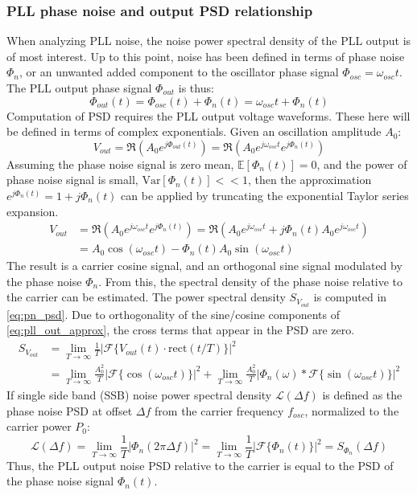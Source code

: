 	\subsubsection{PLL phase noise and output PSD relationship}\label{pn_noise_psd}
		When analyzing PLL noise, the noise power spectral density of the PLL output is of most interest. Up to this point, noise has been defined in terms of phase noise $\Phi_{n}$, or an unwanted added component to the oscillator phase signal $\Phi_{osc}=\omega_{osc}t$. The PLL output phase signal $\Phi_{out}$ is thus:
		\begin{equation}
			\Phi_{out}(t) = \Phi_{osc}(t) + \Phi_{n}(t) = \omega_{osc}t + \Phi_{n}(t) 
		\end{equation}
		Computation of PSD requires the PLL output voltage waveforms. These here will be defined in terms of complex exponentials. Given an oscillation amplitude $A_0$:
		\begin{equation}
			V_{out} = \Re\left(A_0e^{j\Phi_{out}(t)}\right) = \Re\left(A_0e^{j\omega_{osc}t}e^{j\Phi_{n}(t)}\right)
		\end{equation}
		Assuming the phase noise signal is zero mean, $\mathbb{E}[\Phi_{n}(t)]=0$, and the power of phase noise signal is small, $\mathrm{Var}[\Phi_{n}(t)] << 1$, then the approximation $e^{j\Phi_{n}(t)} = 1 + j\Phi_{n}(t)$ can be applied by truncating the exponential Taylor series expansion.
		\begin{align}
			V_{out} &= \Re\left(A_0e^{j\omega_{osc}t}e^{j\Phi_{n}(t)}\right) = \Re\left(A_0e^{j\omega_{osc}t} +j\Phi_{n}(t)A_0e^{j\omega_{osc}t}\right)\\
			&= A_0\cos(\omega_{osc}t) - \Phi_{n}(t)A_0\sin(\omega_{osc}t) \label{eq:pll_out_approx}
		\end{align}
		The result is a carrier cosine signal, and an orthogonal sine signal modulated by the phase noise $\Phi_{n}$. From this, the spectral density of the phase noise relative to the carrier can be estimated. The power spectral density $S_{V_{out}}$ is computed in \ref{eq:pn_psd}. Due to orthogonality of the sine/cosine components of \ref{eq:pll_out_approx}, the cross terms that appear in the PSD are zero. 
		\begin{align}
			S_{V_{out}} &= \lim_{T\rightarrow\infty}\frac{1}{T}|\mathcal{F}\{V_{out}(t)\cdot\mathrm{rect}(t/T)\}|^2 \\
			&=\lim_{T\rightarrow\infty}\frac{A_0^2}{T}|\mathcal{F}\{\cos(\omega_{osc}t)\}|^2 + \lim_{T\rightarrow\infty}\frac{A_0^2}{T}|\Phi_{n}(\omega)*\mathcal{F}\{\sin(\omega_{osc}t)\}|^2 \label{eq:pn_psd}
		\end{align}
		 If single side band (SSB) noise power spectral density $\mathcal{L}(\Delta f)$ is defined as the phase noise PSD at offset $\Delta f$ from the carrier frequency $f_{osc}$, normalized to the carrier power $P_0$:
		\begin{equation}
			\mathcal{L}(\Delta f) = \lim_{T\rightarrow\infty}\frac{1}{T}|\Phi_{n}(2\pi\Delta f)|^2 = \lim_{T\rightarrow\infty}\frac{1}{T}|\mathcal{F}\{\Phi_{n}(t)\}|^2= S_{\Phi_{n}}(\Delta f)
		\end{equation}
		Thus, the PLL output noise PSD relative to the carrier is equal to the PSD of the phase noise signal $\Phi_{n}(t)$.

